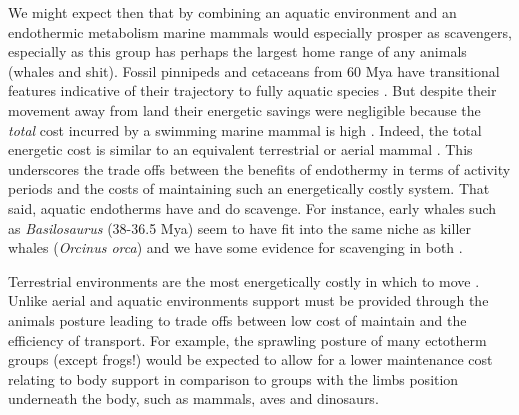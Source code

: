 \documentclass[a4paper,12pt]{article}
\begin{document}
We might expect then that by combining an aquatic environment and an endothermic metabolism marine mammals would especially prosper as scavengers, especially as this group has perhaps the largest home range of any animals (whales and shit).
Fossil pinnipeds and cetaceans from 60 Mya %
have transitional features indicative of their trajectory to fully aquatic species \citep{williams1999evolution}.  
But despite their movement away from land their energetic savings were negligible because the \textit{total} cost incurred by a swimming marine mammal is high \citep{williams1999evolution}. 
Indeed, the total energetic cost is similar to an equivalent terrestrial or aerial mammal \citep{williams1999evolution}.
This underscores the trade offs between the benefits of endothermy in terms of activity periods and the costs of maintaining such an energetically costly system. 
That said, aquatic endotherms have and do scavenge. 
For instance, early whales such as \textit{Basilosaurus} (38-36.5 Mya) seem to have fit into the same niche as killer whales (\textit{Orcinus orca}) and we have some evidence for scavenging in both \citep{fahlke2012bite,Whitehead415}.




Terrestrial environments are the most energetically costly in which to move \citep{tucker1975energetic}. Unlike aerial and aquatic environments support must be provided through the animals posture leading to trade offs between low cost of maintain and the efficiency of transport. For example, the sprawling posture of many ectotherm groups (except frogs!) would be expected to allow for a lower maintenance cost relating to body support in comparison to groups with the limbs position underneath the body, such as mammals, aves and dinosaurs.
\end{document}

